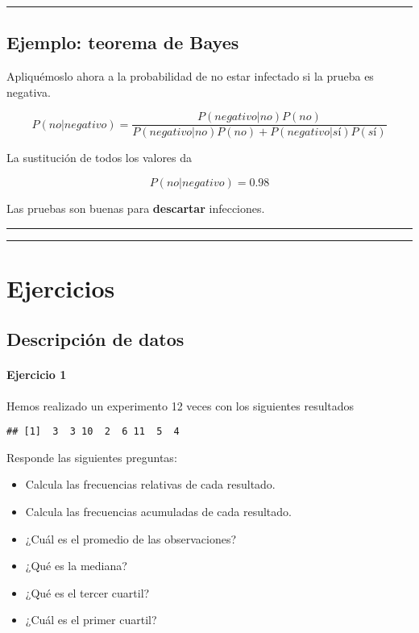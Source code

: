 \documentclass[
]{book}
\providecommand{\tightlist}{%
  \setlength{\itemsep}{0pt}\setlength{\parskip}{0pt}}
\begin{document}
\begin{center}\rule{0.5\linewidth}{0.5pt}\end{center}

\hypertarget{ejemplo-teorema-de-bayes-1}{%
\section{Ejemplo: teorema de Bayes}\label{ejemplo-teorema-de-bayes-1}}

Apliquémoslo ahora a la probabilidad de no estar infectado si la prueba es negativa.

\[P(no|negativo) = \frac{P(negativo|no) P(no)}{P(negativo|no) P(no)+P(negativo|sí)P(sí)}\]

La sustitución de todos los valores da

\[P(no|negativo)=0.98\]

Las pruebas son buenas para \textbf{descartar} infecciones.

\begin{center}\rule{0.5\linewidth}{0.5pt}\end{center}

\begin{center}\rule{0.5\linewidth}{0.5pt}\end{center}

\hypertarget{ejercicios}{%
\chapter{Ejercicios}\label{ejercicios}}

\hypertarget{descripciuxf3n-de-datos-1}{%
\section{Descripción de datos}\label{descripciuxf3n-de-datos-1}}

\hypertarget{ejercicio-1}{%
\subsubsection{Ejercicio 1}\label{ejercicio-1}}

Hemos realizado un experimento 12 veces con los siguientes resultados

\begin{verbatim}
## [1]  3  3 10  2  6 11  5  4
\end{verbatim}

Responde las siguientes preguntas:

\begin{itemize}
\tightlist
\item
  Calcula las frecuencias relativas de cada resultado.
\item
  Calcula las frecuencias acumuladas de cada resultado.
\item
  ¿Cuál es el promedio de las observaciones?
\item
  ¿Qué es la mediana?
\item
  ¿Qué es el tercer cuartil?
\item
  ¿Cuál es el primer cuartil?
\end{itemize}
\end{document}
